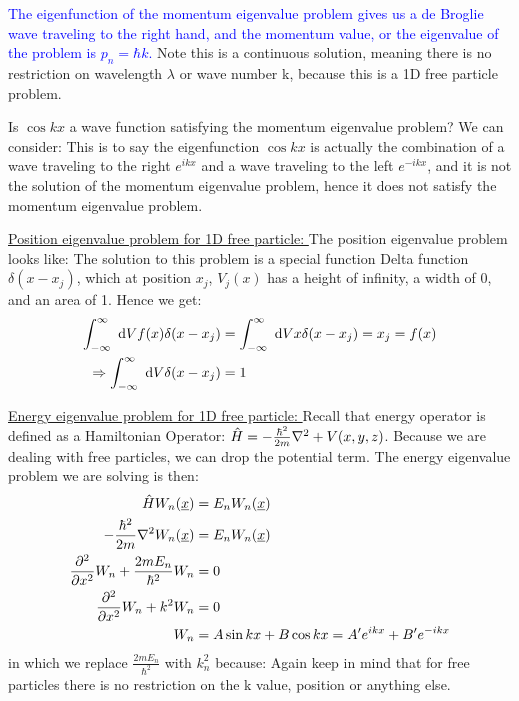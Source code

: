 \documentclass{school-22.101-notes}
\begin{document}
\textcolor{blue}{The eigenfunction of the momentum eigenvalue problem gives us a de Broglie wave traveling to the right hand, and the momentum value, or the eigenvalue of the problem is $p_n = \hbar k$.} Note this is a continuous solution, meaning there is no restriction on wavelength $\lambda$ or wave number k, because this is a 1D free particle problem. 

Is $\cos kx$ a wave function satisfying the momentum eigenvalue problem? We can consider:
This is to say the eigenfunction $\cos kx$ is actually the combination of a wave traveling to the right $e^{ikx}$ and a wave traveling to the left $e^{-ikx}$, and it is not the solution of the momentum eigenvalue problem, hence it does not satisfy the momentum eigenvalue problem. 


\uline{Position eigenvalue problem for 1D free particle: }
The position eigenvalue problem looks like:
The solution to this problem is a special function Delta function $\delta (x - x_j)$, which at position $x_j$, $V_j(x)$ has a height of infinity, a width of 0, and an area of 1. Hence we get:
\begin{align}
\int_{-\infty}^{\infty} \mbox{ }\mathrm{d} V f(x) \delta(x-x_j) &=  \int_{-\infty}^{\infty} \mbox{ }\mathrm{d} V x \delta(x-x_j) = x_j = f(x) \\
\Rightarrow \int_{-\infty}^{\infty} \mbox{ }\mathrm{d} V \delta(x-x_j) &= 1 
\end{align}


\uline{Energy eigenvalue problem for 1D free particle: }
Recall that energy operator is defined as a Hamiltonian Operator: $\hat{H}  = -\frac{\hbar^2}{2m} \nabla^2 + V(x,y,z)$. Because we are dealing with free particles, we can drop the potential term. The energy eigenvalue problem we are solving is then: 
\begin{align}
 \hat{H} W_n (\underline{x}) &= E_n W_n (\underline{x} ) \\
 -\frac{\hbar^2}{2m} \nabla^2 W_n (\underline{x}) &= E_n W_n (\underline{x} ) \\
 \frac{\partial^{2} }{\partial x ^{2}} W_n + \frac{2m E_n}{\hbar^2} W_n &= 0 \\
 \frac{\partial^{2} }{\partial x ^{2}} W_n + k^2 W_n &= 0  \\
 W_n &= A \sin kx + B \cos kx = A^{\prime} e^{ikx} + B^{\prime} e^{-ikx}
\end{align}
in which we replace $\frac{2m E_n}{\hbar^2}$ with $k_n^2$ because:
Again keep in mind that for free particles there is no restriction on the k value, position or anything else. 
\end{document}
